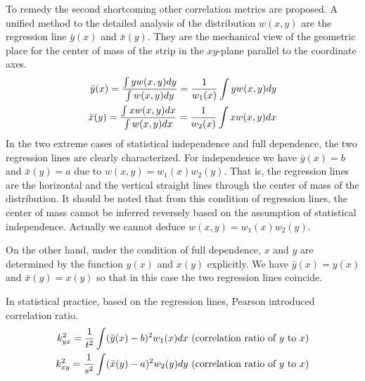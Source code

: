\documentclass{article}
\begin{document}
To remedy the second shortcoming other correlation metrics are proposed.
A unified method to the detailed analysis of the distribution $w(x,y)$ are the regression line $\bar{y}(x)$ and $\bar{x}(y)$.
They are the mechanical view of the geometric place for the center of mass of the strip in
the $xy$-plane parallel to the coordinate axes.
\begin{align}
   \bar{y}(x) = \frac{\int y w(x,y) dy}{\int w(x,y) dy} = \frac{1}{w_1(x)} \int y w(x, y)dy \notag \\
   \bar{x}(y) =  \frac{\int x w(x,y) dx}{\int w(x,y) dx} = \frac{1}{w_2(x)} \int x w(x, y)dx 
\end{align}
In the two extreme cases of statistical independence and
full dependence, the two regression lines are clearly
characterized. For independence we have $\bar{y}(x) = b$
and $\bar{x}(y)=a$ due to $w(x,y) = w_1(x)w_2(y)$.
That is, the regression lines are the horizontal and
the vertical straight lines through the center of mass of the
distribution. It should be noted that from this condition of regression lines,
the center of mass cannot be inferred reversely based on the assumption of statistical independence.
Actually we cannot deduce $w(x,y)=w_1(x)w_2(y)$.

On the other hand, under
the condition of full dependence, $x$ and
$y$ are determined by the function $y(x)$
and $x(y)$ explicitly. We have $\bar{y}(x) = y(x)$
and $\bar{x}(y) = x(y)$ so that in this case
the two regression lines coincide.

In statistical practice, based on the regression lines,
Pearson introduced \textsf{correlation ratio}.
\begin{align}
   k^2_{yx} = \frac{1}{t^2}\int (\bar{y}(x) - b)^2 w_1(x)dx \textrm{ (correlation ratio of $y$ to $x$}) \notag \\
   k^2_{xy} = \frac{1}{s^2}\int (\bar{x}(y) - a)^2 w_2(y)dy \textrm{ (correlation ratio of $y$ to $x$})
\end{align}
\end{document}

